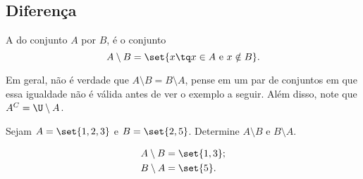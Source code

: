\subsection{Diferença}

\begin{definition}
\label{def:setminus}
A  do conjunto $A$ por $B$, é o conjunto
%
	$$ A\setminus B = \set{x \tq  x \in A \text{ e } x \notin B}.$$
\end{definition}
\begin{remark}
Em geral, não é verdade que $A \setminus B = B \setminus A$, pense em um par de conjuntos 
em que essa igualdade não é válida antes de ver o exemplo a seguir. Além disso, note que $A^C = \U\setminus A$.
\end{remark}

\begin{example}
	Sejam $A = \set{1, 2, 3}$ e $ B = \set{2,5}$. Determine $A \setminus B$ e $B \setminus A$.
	\end{example}
	
	\begin{solution}
	\begin{align*}
		&A \setminus B = \set{1,3};\\
		&B \setminus A = \set{5}.
	\end{align*}
	\end{solution}